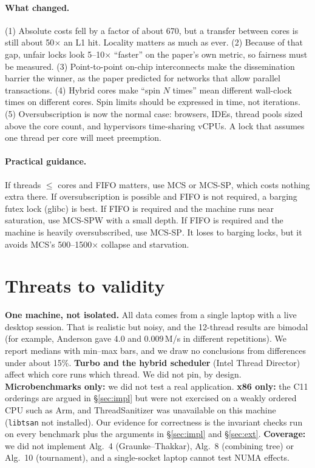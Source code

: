 \documentclass[10pt,twocolumn]{article}
\newcommand{\mcssp}{\textsc{MCS-SP}}
\begin{document}
\paragraph{What changed.} (1) Absolute costs fell by a factor of about 670, but a transfer between cores is
still about 50$\times$ an L1 hit. Locality matters as much as ever. (2) Because of that gap, unfair locks look
5--10$\times$ ``faster'' on the paper's own metric, so fairness must be measured. (3) Point-to-point on-chip
interconnects make the dissemination barrier the winner, as the paper predicted for networks that allow
parallel transactions. (4) Hybrid cores make ``spin $N$ times'' mean different wall-clock times on
different cores. Spin limits should be expressed in time, not iterations. (5) Oversubscription is now
the normal case: browsers, IDEs, thread pools sized above the core count, and hypervisors time-sharing
vCPUs. A lock that assumes one thread per core will meet preemption.
\paragraph{Practical guidance.} If threads $\le$ cores and FIFO matters, use MCS or \mcssp{}, which costs
nothing extra there. If oversubscription is possible and FIFO is not required, a barging futex lock
(glibc) is best. If FIFO is required and the machine runs near saturation, use \mcssp{}W with a small depth.
If FIFO is required and the machine is heavily oversubscribed, use \mcssp{}. It loses to barging locks,
but it avoids MCS's 500--1500$\times$ collapse and starvation.

\section{Threats to validity}
\label{sec:threats}
\textbf{One machine, not isolated.} All data comes from a single laptop with a live desktop session. That is
realistic but noisy, and the 12-thread results are bimodal (for example, Anderson gave 4.0 and 0.009\,M/s in
different repetitions). We report medians with min--max bars, and we draw no conclusions from differences
under about 15\%. \textbf{Turbo and the hybrid scheduler} (Intel Thread Director) affect which core runs which
thread. We did not pin, by design. \textbf{Microbenchmarks only:} we did not test a real application.
\textbf{x86 only:} the C11 orderings are argued in \S\ref{sec:impl} but were not exercised on a weakly
ordered CPU such as Arm, and ThreadSanitizer was unavailable on this machine (\texttt{libtsan} not installed).
Our evidence for correctness is the invariant checks run on every benchmark plus the arguments in
\S\ref{sec:impl} and \S\ref{sec:ext}. \textbf{Coverage:} we did not implement Alg.~4 (Graunke--Thakkar),
Alg.~8 (combining tree) or Alg.~10 (tournament), and a single-socket laptop cannot test NUMA effects.
\end{document}
